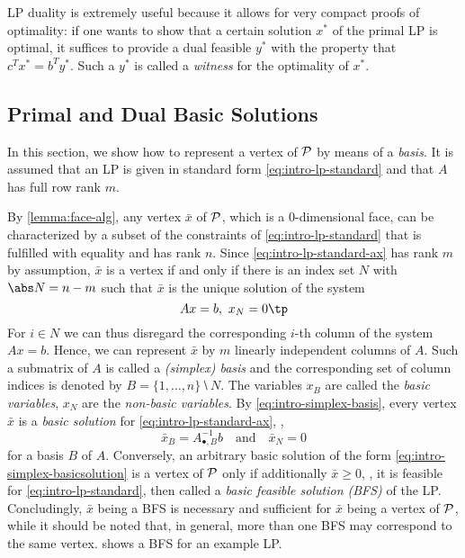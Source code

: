 LP duality is extremely useful because it allows for very compact proofs of optimality: if one wants to show that a certain solution $x^*$ of the primal LP is optimal, it suffices to provide a dual feasible $y^*$ with the property that $c^Tx^* = b^Ty^*$. Such a $y^*$ is called a \emph{witness} for the optimality of $x^*$.

\subsection{Primal and Dual Basic Solutions}
In this section, we show how to represent a vertex of $\P$ by means of a \emph{basis}. It is assumed that an LP is given in standard form \cref{eq:intro-lp-standard} and that $A$ has full row rank $m$.

By \cref{lemma:face-alg}, any vertex $\bar x$ of $\P$, which is a $0$-dimensional face, can be characterized by a subset of the constraints of \cref{eq:intro-lp-standard} that is fulfilled with equality and has rank $n$. Since \cref{eq:intro-lp-standard-ax} has rank $m$ by assumption, $\bar x$ is a vertex if and only if there is an index set $N$ with $\abs N = n-m$ such that $\bar x$ is the unique solution of the system
\begin{equation}\label{eq:intro-simplex-basis}
    Ax = b,\ x_N = 0\tp
\end{equation}
For $i ∈ N$ we can thus disregard the corresponding $i$-th column of the system $Ax=b$. Hence, we can represent $\bar x$ by $m$ linearly independent columns of $A$. Such a submatrix of $A$ is called a \emph{(simplex) basis} and the corresponding set of column indices is denoted by $B = \{1,\dotsc,n\} ⧵ N$. The variables $x_B$ are called the \emph{basic variables}, $x_N$ are the \emph{non-basic variables}. By \cref{eq:intro-simplex-basis}, every vertex $\bar x$ is a \emph{basic solution} for \cref{eq:intro-lp-standard-ax}, \ie,
\begin{equation}\label{eq:intro-simplex-basicsolution}
  \bar x_B = A_{•,B}^{-1} b\quad\text{and}\quad \bar x_N = 0
\end{equation}
for a basis $B$ of $A$. Conversely, an arbitrary basic solution of the form \cref{eq:intro-simplex-basicsolution} is a vertex of $\P$ only if additionally $\bar x ≥ 0$, \ie, it is feasible for \cref{eq:intro-lp-standard}, then called a \emph{basic feasible solution (BFS)} of the LP. Concludingly, $\bar x$ being a BFS is necessary and sufficient for $\bar x$ being a vertex of $\P$, while it should be noted that, in general, more than one BFS may correspond to the same vertex.  shows a BFS for an example LP.

